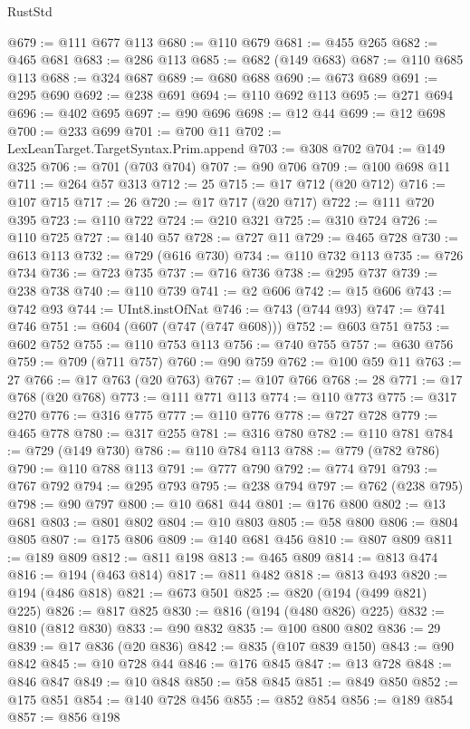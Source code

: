 \begin{lexlean}{RustStd}
\begin{coremodule}
@679 := @111 @677 @113
@680 := @110 @679
@681 := @455 @265
@682 := @465 @681
@683 := @286 @113
@685 := @682 (@149 @683)
@687 := @110 @685 @113
@688 := @324 @687
@689 := @680 @688
@690 := @673 @689
@691 := @295 @690
@692 := @238 @691
@694 := @110 @692 @113
@695 := @271 @694
@696 := @402 @695
@697 := @90 @696
@698 := @12 @44
@699 := @12 @698
@700 := @233 @699
@701 := @700 @11
@702 := LexLeanTarget.TargetSyntax.Prim.append
@703 := @308 @702
@704 := @149 @325
@706 := @701 (@703 @704)
@707 := @90 @706
@709 := @100 @698 @11
@711 := @264 @57 @313
@712 := 25
@715 := @17 @712 (@20 @712)
@716 := @107 @715
@717 := 26
@720 := @17 @717 (@20 @717)
@722 := @111 @720 @395
@723 := @110 @722
@724 := @210 @321
@725 := @310 @724
@726 := @110 @725
@727 := @140 @57
@728 := @727 @11
@729 := @465 @728
@730 := @613 @113
@732 := @729 (@616 @730)
@734 := @110 @732 @113
@735 := @726 @734
@736 := @723 @735
@737 := @716 @736
@738 := @295 @737
@739 := @238 @738
@740 := @110 @739
@741 := @2 @606
@742 := @15 @606
@743 := @742 @93
@744 := UInt8.instOfNat
@746 := @743 (@744 @93)
@747 := @741 @746
@751 := @604 (@607 (@747 (@747 @608)))
@752 := @603 @751
@753 := @602 @752
@755 := @110 @753 @113
@756 := @740 @755
@757 := @630 @756
@759 := @709 (@711 @757)
@760 := @90 @759
@762 := @100 @59 @11
@763 := 27
@766 := @17 @763 (@20 @763)
@767 := @107 @766
@768 := 28
@771 := @17 @768 (@20 @768)
@773 := @111 @771 @113
@774 := @110 @773
@775 := @317 @270
@776 := @316 @775
@777 := @110 @776
@778 := @727 @728
@779 := @465 @778
@780 := @317 @255
@781 := @316 @780
@782 := @110 @781
@784 := @729 (@149 @730)
@786 := @110 @784 @113
@788 := @779 (@782 @786)
@790 := @110 @788 @113
@791 := @777 @790
@792 := @774 @791
@793 := @767 @792
@794 := @295 @793
@795 := @238 @794
@797 := @762 (@238 @795)
@798 := @90 @797
@800 := @10 @681 @44
@801 := @176 @800
@802 := @13 @681
@803 := @801 @802
@804 := @10 @803
@805 := @58 @800
@806 := @804 @805
@807 := @175 @806
@809 := @140 @681 @456
@810 := @807 @809
@811 := @189 @809
@812 := @811 @198
@813 := @465 @809
@814 := @813 @474
@816 := @194 (@463 @814)
@817 := @811 @482
@818 := @813 @493
@820 := @194 (@486 @818)
@821 := @673 @501
@825 := @820 (@194 (@499 @821) @225)
@826 := @817 @825
@830 := @816 (@194 (@480 @826) @225)
@832 := @810 (@812 @830)
@833 := @90 @832
@835 := @100 @800 @802
@836 := 29
@839 := @17 @836 (@20 @836)
@842 := @835 (@107 @839 @150)
@843 := @90 @842
@845 := @10 @728 @44
@846 := @176 @845
@847 := @13 @728
@848 := @846 @847
@849 := @10 @848
@850 := @58 @845
@851 := @849 @850
@852 := @175 @851
@854 := @140 @728 @456
@855 := @852 @854
@856 := @189 @854
@857 := @856 @198

\end{coremodule}
\end{lexlean}
